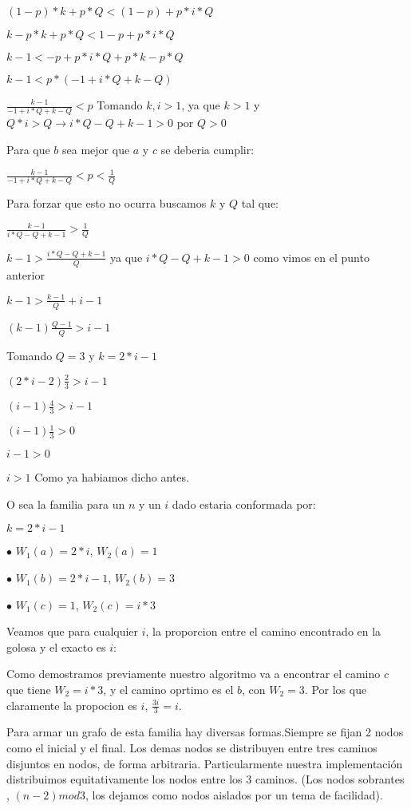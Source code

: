 $(1-p)*k+p*Q < (1-p)+p*i*Q$

$k-p*k+p*Q < 1-p+p*i*Q$

$k-1 < -p+p*i*Q+p*k-p*Q$

$k-1 < p*(-1+i*Q+k-Q)$

$\frac{k-1}{-1+i*Q+k-Q} < p$ Tomando $k,i > 1$, ya que $k > 1$ y $Q*i > Q \rightarrow i*Q-Q+k-1 > 0$ por $Q > 0$

Para que $b$ sea mejor que $a$ y $c$ se deberia cumplir:

$\frac{k-1}{-1+i*Q+k-Q} < p < \frac{1}{Q}$

Para forzar que esto no ocurra buscamos $k$ y $Q$ tal que:

$\frac{k-1}{i*Q-Q+k-1} > \frac{1}{Q}$

$k-1 > \frac{i*Q-Q+k-1}{Q}$ ya que $i*Q-Q+k-1 > 0$ como vimos en el punto anterior

$k-1 > \frac{k-1}{Q}+i-1$

$(k-1) \frac{Q-1}{Q} > i-1$

Tomando $Q=3$ y $k=2*i-1$

$(2*i-2) \frac{2}{3} > i-1$

$(i-1) \frac{4}{3} > i-1$

$(i-1) \frac{1}{3} > 0$

$i-1 > 0$

$i > 1$ Como ya habiamos dicho antes.


O sea la familia para un $n$ y un $i$ dado estaria conformada por:

$k = 2*i-1$

$\bullet$ $W_1(a) = 2*i$, $W_2(a)=1$

$\bullet$ $W_1(b) = 2*i-1$, $W_2(b)=3$

$\bullet$ $W_1(c) = 1$, $W_2(c)=i*3$

Veamos que para cualquier $i$, la proporcion entre el camino encontrado en la golosa y el exacto es $i$:

Como demostramos previamente nuestro algoritmo va a encontrar el camino $c$ que tiene $W_2=i*3$, y el camino oprtimo es el $b$, con $W_2=3$. Por los que claramente la propocion es $i$, $\frac{3i}{3}=i$.

Para armar un grafo de esta familia hay diversas formas.Siempre se fijan 2 nodos como el inicial y el final. Los demas nodos se distribuyen entre tres caminos disjuntos en nodos, de forma arbitraria. Particularmente nuestra implementación distribuimos equitativamente los nodos entre los 3 caminos. (Los nodos sobrantes , $(n-2) mod 3$, los dejamos como nodos aislados por un tema de facilidad).

